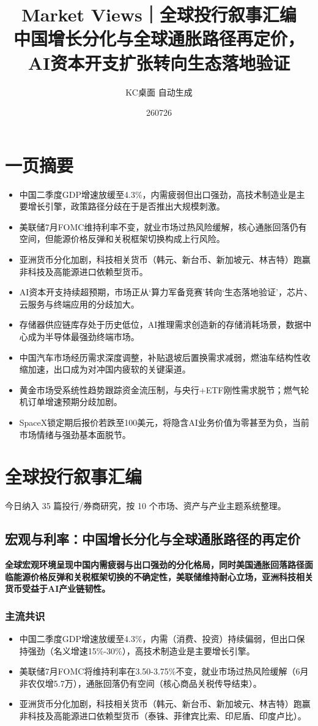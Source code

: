 \documentclass[11pt]{ctexart}
\title{\textbf{Market Views｜全球投行叙事汇编}\\[0.4em]{\large 中国增长分化与全球通胀路径再定价，AI资本开支扩张转向生态落地验证}}
\author{KC桌面 自动生成}
\date{260726}
\begin{document}
\maketitle
\tableofcontents
\newpage
\section{一页摘要}
\begin{itemize}
  \item 中国二季度GDP增速放缓至4.3\%，内需疲弱但出口强劲，高技术制造业是主要增长引擎，政策路径分歧在于是否推出大规模刺激。
  \item 美联储7月FOMC维持利率不变，就业市场过热风险缓解，核心通胀回落仍有空间，但能源价格反弹和关税框架切换构成上行风险。
  \item 亚洲货币分化加剧，科技相关货币（韩元、新台币、新加坡元、林吉特）跑赢非科技及高能源进口依赖型货币。
  \item AI资本开支持续超预期，市场正从‘算力军备竞赛’转向‘生态落地验证’，芯片、云服务与终端应用的分歧加大。
  \item 存储器供应链库存处于历史低位，AI推理需求创造新的存储消耗场景，数据中心成为半导体最强劲终端市场。
  \item 中国汽车市场经历需求深度调整，补贴退坡后置换需求减弱，燃油车结构性收缩加速，出口成为对冲国内疲软的关键渠道。
  \item 黄金市场受系统性趋势跟踪资金流压制，与央行+ETF刚性需求脱节；燃气轮机订单增速预期分歧加剧。
  \item SpaceX锁定期后报价若跌至100美元，将隐含AI业务价值为零甚至为负，当前市场情绪与强劲基本面脱节。
\end{itemize}
\section{全球投行叙事汇编}
今日纳入 35 篇投行/券商研究，按 10 个市场、资产与产业主题系统整理。
\newpage
\subsection{宏观与利率：中国增长分化与全球通胀路径的再定价}
\textbf{全球宏观环境呈现中国内需疲弱与出口强劲的分化格局，同时美国通胀回落路径面临能源价格反弹和关税框架切换的不确定性，美联储维持耐心立场，亚洲科技相关货币受益于AI产业链韧性。}
\subsubsection*{主流共识}
\begin{itemize}
  \item 中国二季度GDP增速放缓至4.3\%，内需（消费、投资）持续偏弱，但出口保持强劲（名义增速15\%-30\%），高技术制造业是主要增长引擎。
  \item 美联储7月FOMC将维持利率在3.50-3.75\%不变，就业市场过热风险缓解（6月非农仅增5.7万），通胀回落仍有空间（核心商品关税传导结束）。
  \item 亚洲货币分化加剧，科技相关货币（韩元、新台币、新加坡元、林吉特）跑赢非科技及高能源进口依赖型货币（泰铢、菲律宾比索、印尼盾、印度卢比）。
\end{itemize}
\end{document}
